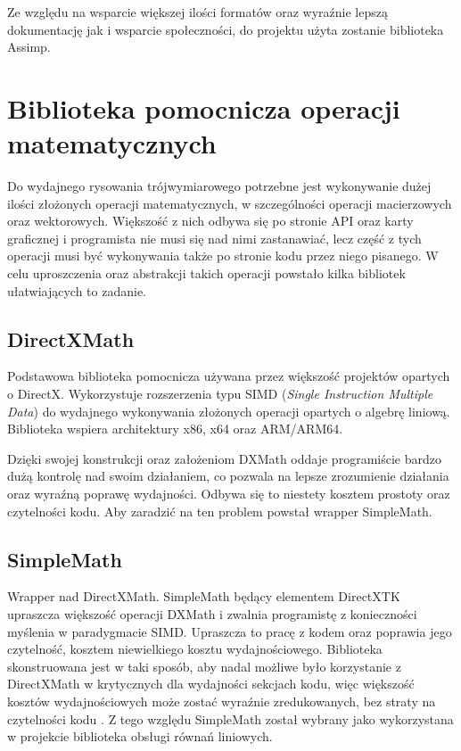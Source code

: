 Ze względu na wsparcie większej ilości formatów oraz wyraźnie lepszą
dokumentację jak i wsparcie społeczności, do projektu użyta zostanie
biblioteka Assimp.

\section{Biblioteka pomocnicza operacji matematycznych}

Do wydajnego rysowania trójwymiarowego potrzebne jest wykonywanie dużej
ilości złożonych operacji matematycznych, w szczególności operacji
macierzowych oraz wektorowych. Większość z nich odbywa się po stronie
API oraz karty graficznej i programista nie musi się nad nimi
zastanawiać, lecz część z tych operacji musi być wykonywania także po
stronie kodu przez niego pisanego. W celu uproszczenia oraz abstrakcji
takich operacji powstało kilka bibliotek ułatwiających to zadanie.

\subsection{DirectXMath}

Podstawowa biblioteka pomocnicza używana przez większość projektów
opartych o DirectX. Wykorzystuje rozszerzenia typu SIMD (\emph{Single
Instruction Multiple Data}) do wydajnego wykonywania złożonych operacji
opartych o algebrę liniową. Biblioteka wspiera architektury x86, x64
oraz ARM/ARM64.

Dzięki swojej konstrukcji oraz założeniom DXMath oddaje programiście
bardzo dużą kontrolę nad swoim działaniem, co pozwala na lepsze
zrozumienie działania oraz wyraźną poprawę wydajności. Odbywa się to
niestety kosztem prostoty oraz czytelności kodu. Aby zaradzić na ten
problem powstał wrapper SimpleMath.

\subsection{SimpleMath}

Wrapper nad DirectXMath. SimpleMath będący elementem DirectXTK upraszcza
większość operacji DXMath i zwalnia programistę z konieczności myślenia
w paradygmacie SIMD. Upraszcza to pracę z kodem oraz poprawia jego
czytelność, kosztem niewielkiego kosztu wydajnościowego. Biblioteka
skonstruowana jest w taki sposób, aby nadal możliwe było korzystanie z
DirectXMath w krytycznych dla wydajności sekcjach kodu, więc większość
kosztów wydajnościowych może zostać wyraźnie zredukowanych, bez straty
na czytelności kodu \cite{github:directxtk:simplemath:2024}. Z tego względu SimpleMath został wybrany
jako wykorzystana w projekcie biblioteka obsługi równań liniowych.

